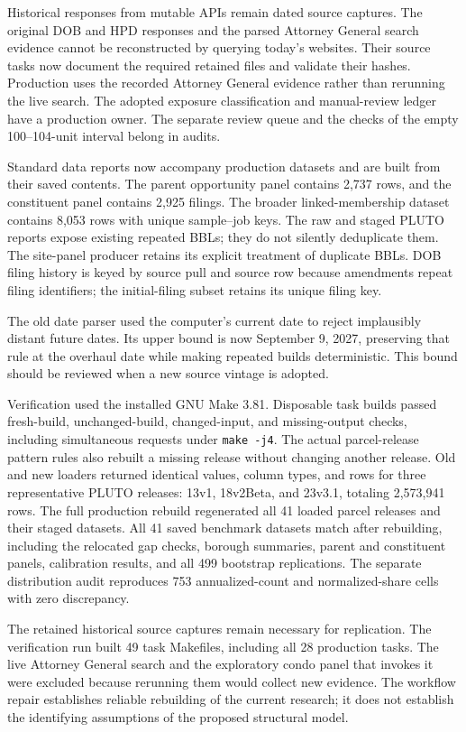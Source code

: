 Historical responses from mutable APIs remain dated source captures. The original DOB and HPD responses and the parsed Attorney General search evidence cannot be reconstructed by querying today's websites. Their source tasks now document the required retained files and validate their hashes. Production uses the recorded Attorney General evidence rather than rerunning the live search. The adopted exposure classification and manual-review ledger have a production owner. The separate review queue and the checks of the empty 100--104-unit interval belong in audits.

Standard data reports now accompany production datasets and are built from their saved contents. The parent opportunity panel contains 2,737 rows, and the constituent panel contains 2,925 filings. The broader linked-membership dataset contains 8,053 rows with unique sample--job keys. The raw and staged PLUTO reports expose existing repeated BBLs; they do not silently deduplicate them. The site-panel producer retains its explicit treatment of duplicate BBLs. DOB filing history is keyed by source pull and source row because amendments repeat filing identifiers; the initial-filing subset retains its unique filing key.

The old date parser used the computer's current date to reject implausibly distant future dates. Its upper bound is now September 9, 2027, preserving that rule at the overhaul date while making repeated builds deterministic. This bound should be reviewed when a new source vintage is adopted.

Verification used the installed GNU Make 3.81. Disposable task builds passed fresh-build, unchanged-build, changed-input, and missing-output checks, including simultaneous requests under \texttt{make -j4}. The actual parcel-release pattern rules also rebuilt a missing release without changing another release. Old and new loaders returned identical values, column types, and rows for three representative PLUTO releases: 13v1, 18v2Beta, and 23v3.1, totaling 2,573,941 rows. The full production rebuild regenerated all 41 loaded parcel releases and their staged datasets. All 41 saved benchmark datasets match after rebuilding, including the relocated gap checks, borough summaries, parent and constituent panels, calibration results, and all 499 bootstrap replications. The separate distribution audit reproduces 753 annualized-count and normalized-share cells with zero discrepancy.

The retained historical source captures remain necessary for replication. The verification run built 49 task Makefiles, including all 28 production tasks. The live Attorney General search and the exploratory condo panel that invokes it were excluded because rerunning them would collect new evidence. The workflow repair establishes reliable rebuilding of the current research; it does not establish the identifying assumptions of the proposed structural model.
